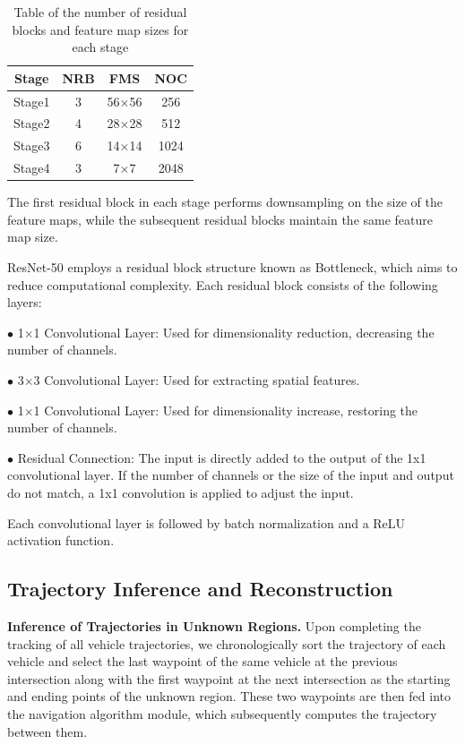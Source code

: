 \documentclass[lettersize,journal]{IEEEtran}
\begin{document}
\begin{table}[t]
	\centering
	\caption{Table of the number of residual blocks and feature map sizes for each stage}
	\label{tab:improved}
	\begin{tabular}{|c|c|c|c|}
		\hline
		\multicolumn{1}{|c|}{Stage} & \multicolumn{1}{c|}{NRB} & \multicolumn{1}{c|}{FMS} & \multicolumn{1}{c|}{NOC} \\
		\hline
		Stage1 & 3 & 56×56 & 256 \\
		\hline
		Stage2 & 4 & 28×28 & 512 \\
		\hline
		Stage3 & 6 & 14×14 & 1024 \\
		\hline
		Stage4 & 3 & 7×7 & 2048 \\
		\hline
	\end{tabular}
\end{table}

The first residual block in each stage performs downsampling on the size of the feature maps, while the subsequent residual blocks maintain the same feature map size.

ResNet-50 employs a residual block structure known as Bottleneck, which aims to reduce computational complexity. 
Each residual block consists of the following layers:

$\bullet$ 1$\times$1 Convolutional Layer: Used for dimensionality reduction, decreasing the number of channels.

$\bullet$ 3$\times$3 Convolutional Layer: Used for extracting spatial features.

$\bullet$ 1$\times$1 Convolutional Layer: Used for dimensionality increase, restoring the number of channels.

$\bullet$ Residual Connection: The input is directly added to the output of the 1x1 convolutional layer. 
If the number of channels or the size of the input and output do not match, a 1x1 convolution is applied to adjust the input.

Each convolutional layer is followed by batch normalization and a ReLU activation function.

\subsection{Trajectory Inference and Reconstruction}

\textbf{Inference of Trajectories in Unknown Regions.}
Upon completing the tracking of all vehicle trajectories, we chronologically sort the trajectory of each vehicle and select the last waypoint of the same vehicle at the previous intersection along with the first waypoint at the next intersection as the starting and ending points of the unknown region. 
These two waypoints are then fed into the navigation algorithm module, which subsequently computes the trajectory between them.
\end{document}
